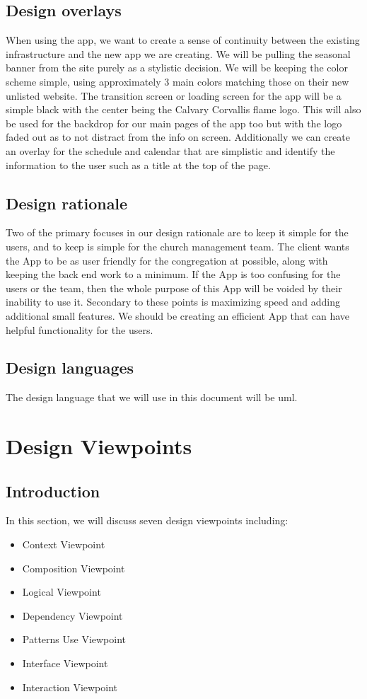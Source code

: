 \documentclass[letterpaper,10pt,draftclsnofoot,onecolumn,titlepage]{IEEEtran}
\begin{document}
		\subsection{Design overlays}
		When using the app, we want to create a sense of continuity between the existing infrastructure and the new app we are creating.
		We will be pulling the seasonal banner from the site purely as a stylistic decision.
		We will be keeping the color scheme simple, using approximately 3 main colors matching those on their new unlisted website.
		The transition screen or loading screen for the app will be a simple black with the center being the Calvary Corvallis flame logo.
		This will also be used for the backdrop for our main pages of the app too but with the logo faded out as to not distract from the info on screen.
		Additionally we can create an overlay for the schedule and calendar that are simplistic and identify the information to the user such as a title at the top of the page.

		\subsection{Design rationale}
		Two of the primary focuses in our design rationale are to keep it simple for the users, and to keep is simple for the church management team.
		The client wants the \gls{App} to be as user friendly for the congregation at possible, along with keeping the back end work to a minimum.
		If the \gls{App} is too confusing for the users or the team, then the whole purpose of this \gls{App} will be voided by their inability to use it.
		Secondary to these points is maximizing speed and adding additional small features.
		We should be creating an efficient \gls{App} that can have helpful functionality for the users.

		\subsection{Design languages}
		The design language that we will use in this document will be \gls{uml}.

	\section{Design Viewpoints}

		\subsection{Introduction}
		In this section, we will discuss seven design viewpoints including:
			\begin{itemize}
				\item{Context Viewpoint}
				\item{Composition Viewpoint}
				\item{Logical Viewpoint}
				\item{Dependency Viewpoint}
				\item{Patterns Use Viewpoint}
				\item{Interface Viewpoint}
				\item{Interaction Viewpoint}
			\end{itemize}
\end{document}
